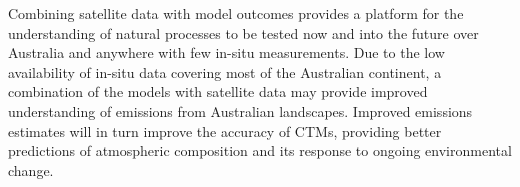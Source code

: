 Combining satellite data with model outcomes provides a platform for the understanding of natural processes to be tested now and into the future over Australia and anywhere with few in-situ measurements.
Due to the low availability of in-situ data covering most of the Australian continent, a combination of the models with satellite data may provide improved understanding of emissions from Australian landscapes.
Improved emissions estimates will in turn improve the accuracy of CTMs, providing better predictions of atmospheric composition and its response to ongoing environmental change.
